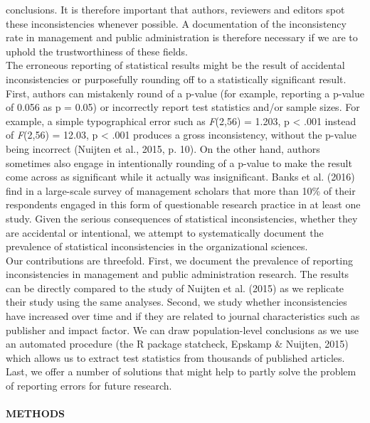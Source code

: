\documentclass[english,man]{apa6}
\newcounter{author}
\begin{document}
conclusions. It is therefore important that authors, reviewers and
editors spot these inconsistencies whenever possible. A documentation of
the inconsistency rate in management and public administration is
therefore necessary if we are to uphold the trustworthiness of these
fields.\\The erroneous reporting of statistical results might be the
result of accidental inconsistencies or purposefully rounding off to a
statistically significant result. First, authors can mistakenly round of
a p-value (for example, reporting a p-value of 0.056 as p = 0.05) or
incorrectly report test statistics and/or sample sizes. For example, a
simple typographical error such as \emph{F}(2,56) = 1.203, p \textless{}
.001 instead of \emph{F}(2,56) = 12.03, p \textless{} .001 produces a
gross inconsistency, without the p-value being incorrect (Nuijten et
al., 2015, p. 10). On the other hand, authors sometimes also engage in
intentionally rounding of a p-value to make the result come across as
significant while it actually was insignificant. Banks et al. (2016)
find in a large-scale survey of management scholars that more than 10\%
of their respondents engaged in this form of questionable research
practice in at least one study. Given the serious consequences of
statistical inconsistencies, whether they are accidental or intentional,
we attempt to systematically document the prevalence of statistical
inconsistencies in the organizational sciences.\\Our contributions are
threefold. First, we document the prevalence of reporting
inconsistencies in management and public administration research. The
results can be directly compared to the study of Nuijten et al. (2015)
as we replicate their study using the same analyses. Second, we study
whether inconsistencies have increased over time and if they are related
to journal characteristics such as publisher and impact factor. We can
draw population-level conclusions as we use an automated procedure (the
R package statcheck, Epskamp \& Nuijten, 2015) which allows us to
extract test statistics from thousands of published articles. Last, we
offer a number of solutions that might help to partly solve the problem
of reporting errors for future research.

\paragraph{METHODS}\label{methods}
\end{document}
